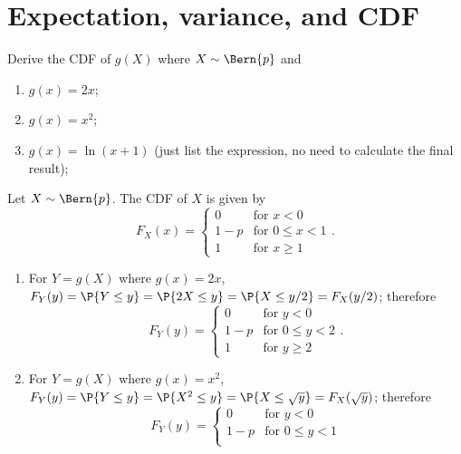 \section{Expectation, variance, and CDF}
\label{sec:section-4.4}

\begin{exercise}
	Derive the CDF of $g(X)$ where $X\sim \Bern{p}$ and 
	\begin{enumerate}
		\item $g(x)=2x$;
		\item $g(x)=x^2$;
		\item $g(x)=\ln (x+1)$ (just list the expression, no need to calculate the final result);
	\end{enumerate}
	\begin{solution}
		Let $X\sim \Bern{p}$. The CDF of $X$ is given by
		\begin{equation*}
			F_X(x) =
			\begin{cases}
				0 & \text{for } x < 0 \\
				1 - p & \text{for } 0 \leq x < 1 \\
				1 & \text{for } x \geq 1
			\end{cases}.
		\end{equation*}
		\begin{enumerate}
			\item For $Y = g(X)$ where $g(x) = 2x$, $F_Y(y) = \P{Y \leq y} = \P{2X \leq y} = \P{X \leq y / 2} = F_X(y/2)$; therefore
			\begin{equation*}
				F_Y(y) =
				\begin{cases}
					0 & \text{for } y < 0 \\
					1 - p & \text{for } 0 \leq y < 2 \\
					1 & \text{for } y \geq 2
				\end{cases}.
			\end{equation*}
			\item For $Y = g(X)$ where $g(x) = x^2$, $F_Y(y) = \P{Y \leq y} = \P{X^2 \leq y} = \P{X \leq \sqrt{y}} = F_X(\sqrt{y})$; therefore
			\begin{equation*}
				F_Y(y) =
				\begin{cases}
					0 & \text{for } y < 0 \\
					1 - p & \text{for } 0 \leq y < 1 \\

\end{cases}
\end{equation*}
\end{enumerate}
\end{solution}
\end{exercise}

